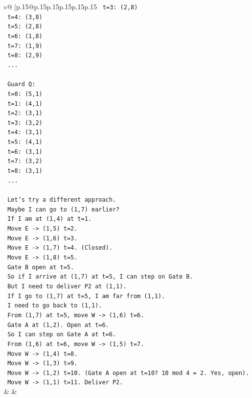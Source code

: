 \documentclass{article}
\begin{document}
{\begin{supertabular}{c@{$\;$}|p{.15\linewidth}@{}p{.15\linewidth}p{.15\linewidth}p{.15\linewidth}p{.15\linewidth}p{.15\linewidth}}
{{{\texttt{   t=3: (2,8)} \\
\texttt{   t=4: (3,8)} \\
\texttt{   t=5: (2,8)} \\
\texttt{   t=6: (1,8)} \\
\texttt{   t=7: (1,9)} \\
\texttt{   t=8: (2,9)} \\
\texttt{   ...} \\
\\ 
\texttt{   Guard Q:} \\
\texttt{   t=0: (5,1)} \\
\texttt{   t=1: (4,1)} \\
\texttt{   t=2: (3,1)} \\
\texttt{   t=3: (3,2)} \\
\texttt{   t=4: (3,1)} \\
\texttt{   t=5: (4,1)} \\
\texttt{   t=6: (3,1)} \\
\texttt{   t=7: (3,2)} \\
\texttt{   t=8: (3,1)} \\
\texttt{   ...} \\
\\ 
\texttt{   Let's try a different approach.} \\
\texttt{   Maybe I can go to (1,7) earlier?} \\
\texttt{   If I am at (1,4) at t=1.} \\
\texttt{   Move E {-}> (1,5) t=2.} \\
\texttt{   Move E {-}> (1,6) t=3.} \\
\texttt{   Move E {-}> (1,7) t=4. (Closed).} \\
\texttt{   Move E {-}> (1,8) t=5.} \\
\texttt{   Gate B open at t=5.} \\
\texttt{   So if I arrive at (1,7) at t=5, I can step on Gate B.} \\
\texttt{   But I need to deliver P2 at (1,1).} \\
\texttt{   If I go to (1,7) at t=5, I am far from (1,1).} \\
\texttt{   I need to go back to (1,1).} \\
\texttt{   From (1,7) at t=5, move W {-}> (1,6) t=6.} \\
\texttt{   Gate A at (1,2). Open at t=6.} \\
\texttt{   So I can step on Gate A at t=6.} \\
\texttt{   From (1,6) at t=6, move W {-}> (1,5) t=7.} \\
\texttt{   Move W {-}> (1,4) t=8.} \\
\texttt{   Move W {-}> (1,3) t=9.} \\
\texttt{   Move W {-}> (1,2) t=10. (Gate A open at t=10? 10 mod 4 = 2. Yes, open).} \\
\texttt{   Move W {-}> (1,1) t=11. Deliver P2.} \\
            }
        }
    }
    & & \\ \\


\end{supertabular}}
\end{document}
